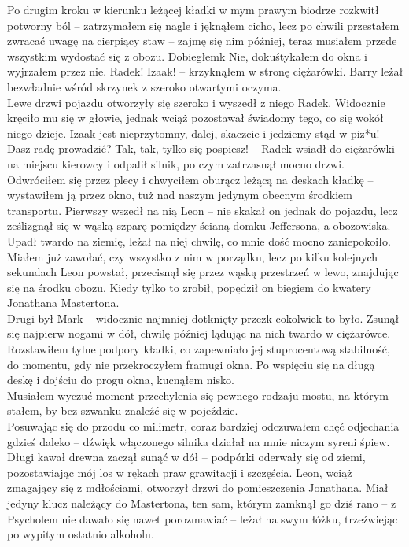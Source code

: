 \documentclass[../MAIN.tex]{subfiles}
\begin{document}
Po drugim kroku w kierunku leżącej kładki w mym prawym biodrze rozkwitł potworny ból -- zatrzymałem się nagle i jęknąłem cicho, lecz po chwili przestałem zwracać uwagę na cierpiący staw -- zajmę się nim później, teraz musiałem przede wszystkim wydostać się z obozu. Dobiegłem\3k Nie, dokuśtykałem do okna i wyjrzałem przez nie.
\sx Radek! Izaak! -- krzyknąłem w stronę ciężarówki.
\qd
Barry leżał bezwładnie wśród skrzynek z szeroko otwartymi oczyma.\\
Lewe drzwi pojazdu otworzyły się szeroko i wyszedł z niego Radek. Widocznie kręciło mu się w głowie, jednak wciąż pozostawał świadomy tego, co się wokół niego dzieje.
\sx Izaak jest nieprzytomny, dalej, skaczcie i jedziemy stąd w piz*u!
\xx Dasz radę prowadzić?
\xx Tak, tak, tylko się pospiesz! -- Radek wsiadł do ciężarówki na miejscu kierowcy i odpalił silnik, po czym zatrzasnął mocno drzwi.
\qd
Odwróciłem się przez plecy i chwyciłem oburącz leżącą na deskach kładkę -- wystawiłem ją przez okno, tuż nad naszym jedynym obecnym środkiem transportu. Pierwszy wszedł na nią Leon -- nie skakał on jednak do pojazdu, lecz ześlizgnął się w wąską szparę pomiędzy ścianą domku Jeffersona, a obozowiska. Upadł twardo na ziemię, leżał na niej chwilę, co mnie dość mocno zaniepokoiło.\\ Miałem już zawołać, czy wszystko z nim w porządku, lecz po kilku kolejnych sekundach Leon powstał, przecisnął się przez wąską przestrzeń w lewo, znajdując się na środku obozu. Kiedy tylko to zrobił, popędził on biegiem do kwatery Jonathana Mastertona.\\
Drugi był Mark -- widocznie najmniej dotknięty przez\3k cokolwiek to było. Zsunął się najpierw nogami w dół, chwilę później lądując na nich twardo w ciężarówce. Rozstawiłem tylne podpory kładki, co zapewniało jej stuprocentową stabilność, do momentu, gdy nie przekroczyłem framugi okna. Po wspięciu się na długą deskę i dojściu do progu okna, kucnąłem nisko.\\
Musiałem wyczuć moment przechylenia się pewnego rodzaju mostu, na którym stałem, by bez szwanku znaleźć się w pojeździe.\\ Posuwając się do przodu co milimetr, coraz bardziej odczuwałem chęć odjechania gdzieś daleko -- dźwięk włączonego silnika działał na mnie niczym syreni śpiew.
Długi kawał drewna zaczął sunąć w dół -- podpórki oderwały się od ziemi, pozostawiając mój los w rękach praw grawitacji i szczęścia.
% 
% 
Leon, wciąż zmagający się z mdłościami, otworzył drzwi do pomieszczenia Jonathana. Miał jedyny klucz należący do Mastertona, ten sam, którym zamknął go dziś rano -- z Psycholem nie dawało się nawet porozmawiać -- leżał na swym łóżku, trzeźwiejąc po wypitym ostatnio alkoholu.\\
\end{document}
